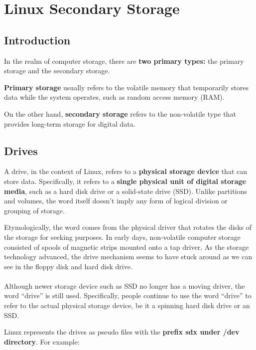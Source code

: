\documentclass{article}
\newenvironment{blocktemplateI}[1]{%
    \tcolorbox[beamer,%
    noparskip,breakable,
    colframe=Violet,%
    colbacklower=Black,%
    title=#1]}%
    {\endtcolorbox}
\begin{document}
\newpage
\section{Linux Secondary Storage}

\subsection{Introduction}

In the realm of computer storage, there are \textbf{two primary types:} the primary storage and the secondary storage.

\textbf{Primary storage} usually refers to the volatile memory that temporarily stores data while the system operates, such as random access memory (RAM).

On the other hand, \textbf{secondary storage} refers to the non-volatile type that provides long-term storage for digital data.

\subsection{Drives}
A drive, in the context of Linux, refers to a \textbf{physical storage device} that can store data. Specifically, it refers to a \textbf{single physical unit of digital storage media}, such as a hard disk drive or a solid-state drive (SSD). Unlike partitions and volumes, the word itself doesn't imply any form of logical division or grouping of storage.

\begin{blocktemplateI}{Note}
Etymologically, the word comes from the physical driver that rotates the disks of the storage for seeking purposes. In early days, non-volatile computer storage consisted of spools of magnetic strips mounted onto a tap driver. As the storage technology advanced, the drive mechanism seems to have stuck around as we can see in the floppy disk and hard disk drive.
\\\\
Although newer storage device such as SSD no longer has a moving driver, the word “drive” is still used. Specifically, people continue to use the word “drive” to refer to the actual physical storage device, be it a spinning hard disk drive or an SSD.
\end{blocktemplateI}


Linux represents the drives as pseudo files with the \textbf{prefix sdx under /dev directory}. For example:
\end{document}
